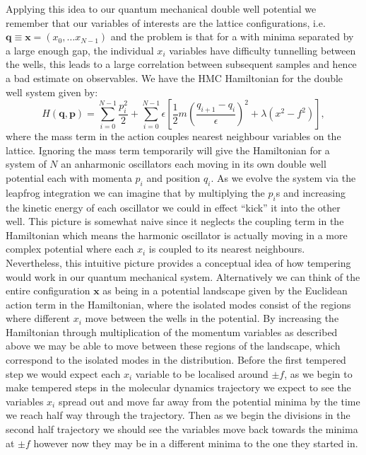 \documentclass[12pt]{article}
\begin{document}
    Applying this idea to our quantum mechanical double well potential we remember that our variables of interests are the lattice configurations, i.e. $\bm{q}\equiv\bm{x}=\left(x_0,\dots x_{N-1}\right)$ and the problem is that for a with minima separated by a large enough gap, the individual $x_i$ variables have difficulty tunnelling between the wells, this leads to a large correlation between subsequent samples and hence a bad estimate on observables. We have the HMC Hamiltonian for the double well system given by:
    \begin{equation}
        H\left(\bm{q},\bm{p}\right) = \sum_{i=0}^{N-1}\frac{p_i^2}{2} + \sum_{i=0}^{N-1} \epsilon \left[\frac{1}{2}m\left(\frac{q_{i+1}-q_{i}}{\epsilon}\right)^2 + \lambda\left(x^2-f^2\right)\right],
    \end{equation}
    where the mass term in the action couples nearest neighbour variables on the lattice. Ignoring the mass term temporarily will give the Hamiltonian for a system of $N$ an anharmonic oscillators each moving in its own double well potential each with momenta $p_i$ and position $q_i$. As we evolve the system via the leapfrog integration we can imagine that by multiplying the $p_i$s and increasing the kinetic energy of each oscillator we could in effect ``kick'' it into the other well. This picture is somewhat naive since it neglects the coupling term in the Hamiltonian which means the harmonic oscillator is actually moving in a more complex potential where each $x_i$ is coupled to its nearest neighbours. Nevertheless, this intuitive picture provides a conceptual idea of how tempering would work in our quantum mechanical system. Alternatively we can think of the entire configuration $\bm{x}$ as being in a potential landscape given by the Euclidean action term in the Hamiltonian, where the isolated modes consist of the regions where different $x_i$ move between the wells in the potential. By increasing the Hamiltonian through multiplication of the momentum variables as described above we may be able to move between these regions of the landscape, which correspond to the isolated modes in the distribution. Before the first tempered step we would expect each $x_i$ variable to be localised around $\pm f$, as we begin to make tempered steps in the molecular dynamics trajectory we expect to see the variables $x_i$ spread out and move far away from the potential minima by the time we reach half way through the trajectory. Then as we begin the divisions in the second half trajectory we should see the variables move back towards the minima at $\pm f$ however now they may be in a different minima to the one they started in.
\end{document}
